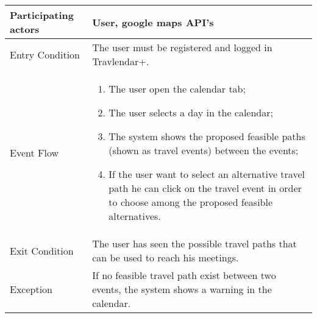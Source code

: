 \begin{table}[H]
	\begin{center}
		\begin{tabular}{ | p{} | p{} | }
		\hline
		Participating actors & User, google maps API’s\\
		\hline
		Entry Condition & The user must be registered and logged in Travlendar+.\\
		\hline
		Event Flow & 
			\begin{enumerate}
				\item The user open the calendar tab;
				\item The user selects a day in the calendar;
				\item The system shows the proposed feasible paths (shown as travel events) between the events;
				\item If the user want to select an alternative travel path he can click on the travel event in order to choose among the proposed feasible alternatives.
			\end{enumerate} \\
		\hline
		Exit Condition & The user has seen the possible travel paths that can be used to reach his meetings.\\
		\hline
		Exception & If no feasible travel path exist between two events, the system shows a warning in the calendar.\\ 
		\hline
		\end{tabular}
	\end{center}
\end{table}
